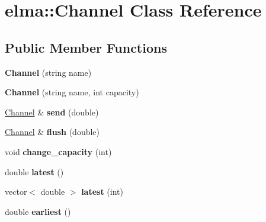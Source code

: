 \hypertarget{classelma_1_1_channel}{}\section{elma\+::Channel Class Reference}
\label{classelma_1_1_channel}
\subsection*{Public Member Functions}
\begin{DoxyCompactItemize}
\item 
\mbox{\label{classelma_1_1_channel_ab7c59200d6449e4634ee6d58c2a8a795}} 
{\bfseries Channel} (string name)
\item 
\mbox{\label{classelma_1_1_channel_a8d04620c1d7217ebfbf4ddbc2639f99b}} 
{\bfseries Channel} (string name, int capacity)
\item 
\mbox{\label{classelma_1_1_channel_a019c853e22c403dc63d98122a4a7d084}} 
\mbox{\hyperlink{classelma_1_1_channel}{Channel}} \& {\bfseries send} (double)
\item 
\mbox{\label{classelma_1_1_channel_af0a9083172349de2d4514bd7c32ed7db}} 
\mbox{\hyperlink{classelma_1_1_channel}{Channel}} \& {\bfseries flush} (double)
\item 
\mbox{\label{classelma_1_1_channel_a5954d5764f9a1f040cf5fa0ff43fc67a}} 
void {\bfseries change\+\_\+capacity} (int)
\item 
\mbox{\label{classelma_1_1_channel_a897b76b1fbb072cc183df9eb0cd3da05}} 
double {\bfseries latest} ()
\item 
\mbox{\label{classelma_1_1_channel_aea3872de3b781aa2a7b2db86672495e3}} 
vector$<$ double $>$ {\bfseries latest} (int)
\item 
\mbox{\label{classelma_1_1_channel_ada92724439358b42051b056c2bf6fb41}} 
double {\bfseries earliest} ()
\item 
\mbox{\label{classelma_1_1_channel_ad19856dfd22f142e4b503292e5a356ab}} 

\end{DoxyCompactItemize}
